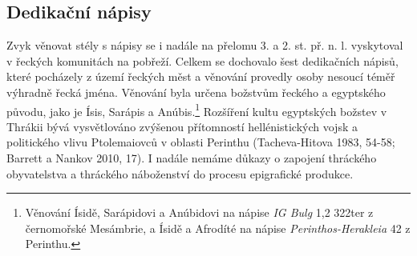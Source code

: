 
\subsection[dedikační-nápisy-6]{Dedikační nápisy}

Zvyk věnovat stély s nápisy se i nadále na přelomu 3. a 2. st. př. n. l. vyskytoval v řeckých komunitách na pobřeží. Celkem se dochovalo šest dedikačních nápisů, které pocházely z území řeckých měst a věnování provedly osoby nesoucí téměř výhradně řecká jména. Věnování byla určena božstvům řeckého a egyptského původu, jako je Ísis, Sarápis a Anúbis.\footnote{Věnování Ísidě, Sarápidovi a Anúbidovi na nápise {\em IG Bulg} 1,2 322ter z černomořské Mesámbrie, a Ísidě a Afrodíté na nápise {\em Perinthos-Herakleia} 42 z Perinthu.} Rozšíření kultu egyptských božstev v Thrákii bývá vysvětlováno zvýšenou přítomností hellénistických vojsk a politického vlivu Ptolemaiovců v oblasti Perinthu (Tacheva-Hitova 1983, 54-58; Barrett a Nankov 2010, 17). I nadále nemáme důkazy o zapojení thráckého obyvatelstva a thráckého náboženství do procesu epigrafické produkce.

